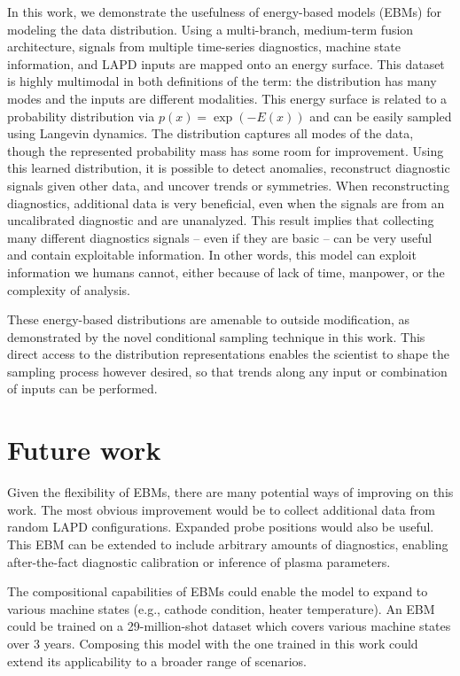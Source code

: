 In this work, we demonstrate the usefulness of energy-based models (EBMs) for modeling the data distribution. Using a multi-branch, medium-term fusion architecture, signals from multiple time-series diagnostics, machine state information, and LAPD inputs are mapped onto an energy surface. This dataset is highly multimodal in both definitions of the term: the distribution has many modes and the inputs are different modalities. This energy surface is related to a probability distribution via $p(x) = \exp(-E(x))$ and can be easily sampled using Langevin dynamics. The distribution captures all modes of the data, though the represented probability mass has some room for improvement. Using this learned distribution, it is possible to detect anomalies, reconstruct diagnostic signals given other data, and uncover trends or symmetries. When reconstructing diagnostics, additional data is very beneficial, even when the signals are from an uncalibrated diagnostic and are unanalyzed. This result implies that collecting many different diagnostics signals -- even if they are basic -- can be very useful and contain exploitable information. In other words, this model can exploit information we humans cannot, either because of lack of time, manpower, or the complexity of analysis.

These energy-based distributions are amenable to outside modification, as demonstrated by the novel conditional sampling technique in this work. This direct access to the distribution representations enables the scientist to shape the sampling process however desired, so that trends along any input or combination of inputs can be performed.

\section{Future work}
Given the flexibility of EBMs, there are many potential ways of improving on this work. The most obvious improvement would be to collect additional data from random LAPD configurations. Expanded probe positions would also be useful. This EBM can be extended to include arbitrary amounts of diagnostics, enabling after-the-fact diagnostic calibration or inference of plasma parameters. 

The compositional capabilities of EBMs could enable the model to expand to various machine states (e.g., cathode condition, heater temperature). An EBM could be trained on a 29-million-shot dataset which covers various machine states over 3 years. Composing this model with the one trained in this work could extend its applicability to a broader range of scenarios.

